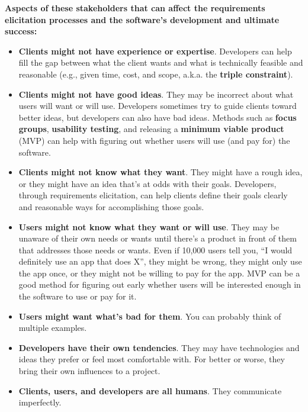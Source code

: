 \spacer
\noindent\textbf{Aspects of these stakeholders that can affect the requirements elicitation processes and the software's development and ultimate success:}\\

\begin{itemize}
\item{\marginpar{\tripleConstraintDef\margindivider}\marginpar{\focusGroupDef\margindivider}\marginpar{\usabilityTestingDef\margindivider}\marginpar{\mvpDef\margindivider}\marginpar{\softwareProcessModelDef}\textbf{Clients might not have experience or expertise}. Developers can help fill the gap between what the client wants and what is technically feasible and reasonable (e.g., given time, cost, and scope, a.k.a. the \textbf{triple constraint}).}\\
\item{\textbf{Clients might not have good ideas}. They may be incorrect about what users will want or will use. Developers sometimes try to guide clients toward better ideas, but developers can also have bad ideas. Methods such as \textbf{focus groups}, \textbf{usability testing}, and releasing a \textbf{minimum viable product} (MVP) can help with figuring out whether users will use (and pay for) the software.}\\
\item{\textbf{Clients might not know what they want}. They might have a rough idea, or they might have an idea that's at odds with their goals. Developers, through requirements elicitation, can help clients define their goals clearly and reasonable ways for accomplishing those goals.}\\
\item{\textbf{Users might not know what they want or will use}. They may be unaware of their own needs or wants until there's a product in front of them that addresses those needs or wants. Even if 10,000 users tell you, ``I would definitely use an app that does X'', they might be wrong, they might only use the app once, or they might not be willing to pay for the app. MVP can be a good method for figuring out early whether users will be interested enough in the software to use or pay for it.}\\
\item{\textbf{Users might want what's bad for them}. You can probably think of multiple examples.}\\
\item{\textbf{Developers have their own tendencies}. They may have technologies and ideas they prefer or feel most comfortable with. For better or worse, they bring their own influences to a project.}\\
\item{\textbf{Clients, users, and developers are all humans}. They communicate imperfectly.}\\
\end{itemize}

